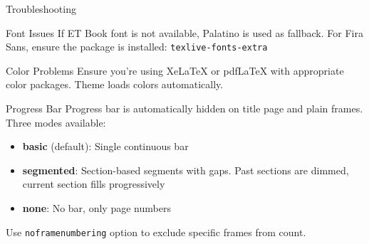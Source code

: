 \documentclass[aspectratio=169]{beamer}
\begin{document}
\begin{frame}[allowframebreaks]{Troubleshooting}
  \begin{shibuiframe}{Font Issues}
    If ET Book font is not available, Palatino is used as fallback. For Fira Sans, ensure the package is installed: \texttt{texlive-fonts-extra}
  \end{shibuiframe}

  \vspace{0.5em}

  \begin{shibuiframe}{Color Problems}
    Ensure you're using XeLaTeX or pdfLaTeX with appropriate color packages. Theme loads colors automatically.
  \end{shibuiframe}

  \vspace{0.5em}

  \begin{shibuiframe}{Progress Bar}
    Progress bar is automatically hidden on title page and plain frames. Three modes available:

    \begin{itemize}
      \item \textbf{basic} (default): Single continuous bar
      \item \textbf{segmented}: Section-based segments with gaps. Past sections are dimmed, current section fills progressively
      \item \textbf{none}: No bar, only page numbers
    \end{itemize}

    Use \texttt{noframenumbering} option to exclude specific frames from count.
  \end{shibuiframe}
\end{frame}
\end{document}

